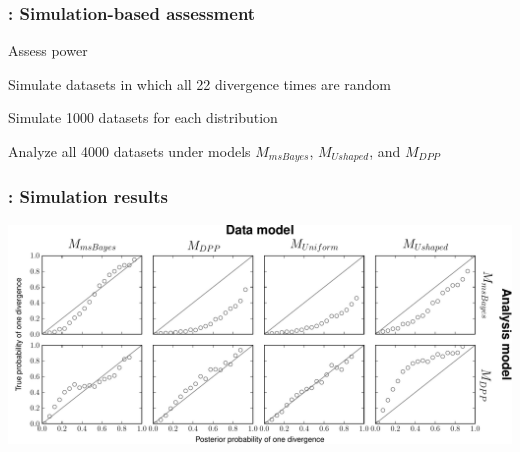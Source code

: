 \begin{frame}
    \frametitle{\dppmsbayes: Simulation-based assessment}
    Assess power \\
    \smallskip
    \begin{myitemize}
        \item Simulate datasets in which all 22 divergence times are random
        \item Simulate 1000 datasets for each \divTime{} distribution
        \item Analyze all 4000 datasets under models $M_{msBayes}$, $M_{Ushaped}$, and $M_{DPP}$
    \end{myitemize}
\end{frame}


\begin{frame}
    \frametitle{\dppmsbayes: Simulation results}
    \centerline{
        \includegraphics[width=1.13\textwidth]{../images/validation-model-choice-old-dpp-full.pdf}}
\end{frame}

